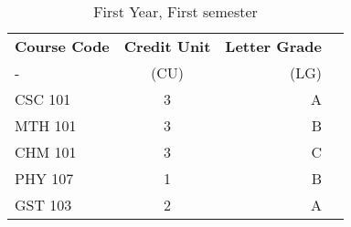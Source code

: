 \documentclass{article}
\begin{document}
	
\begin{table}[h!]
	\begin{center}
      \caption{First Year, First semester}
      \label{tab:table1}
      \begin{tabular}{l|c|r|c}
      	\textbf{Course Code} & \textbf{Credit Unit} & 
      	\textbf{Letter Grade}\\
      	- & (CU) & (LG) \\ 
      	\hline
      	CSC 101 & 3 & A\\
      	MTH 101 & 3 & B\\
      	CHM 101 & 3 & C\\
      	PHY 107 & 1 & B\\
      	GST 103 & 2 & A\\
      \end{tabular}		
  \end{center}
\end{table}
\end{document}
